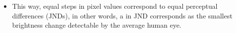 \begin{itemize}
\item This way, equal steps in pixel values correspond to equal
  perceptual differences (\glspl{JND}), in other words, a
   in
  \gls{JND} corresponds as the smallest brightness change detectable
  by the average human eye.
\end{itemize}
